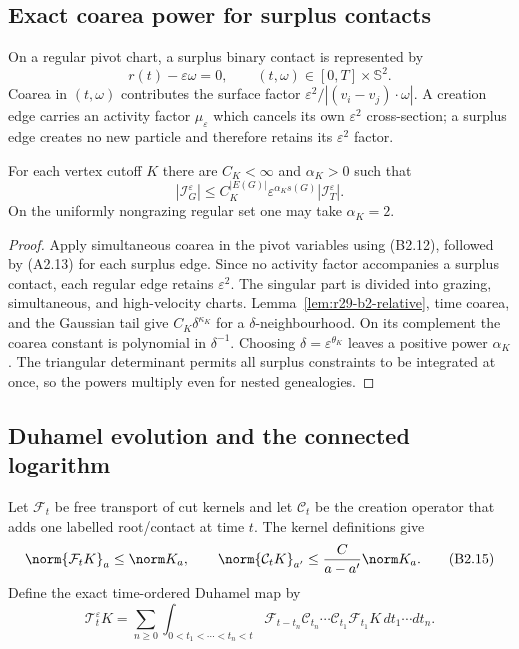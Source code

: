 \subsection{Exact coarea power for surplus contacts}

On a regular pivot chart, a surplus binary contact is represented by
\[
 r(t)-\varepsilon\omega=0,
 \qquad (t,\omega)\in[0,T]\times\mathbb S^2.              \tag{B2.13}
\]
Coarea in $(t,\omega)$ contributes the surface factor
$\varepsilon^2/|(v_i-v_j)\cdot\omega|$.  A creation edge carries an activity
factor $\mu_\varepsilon$ which cancels its own $\varepsilon^2$ cross-section;
a surplus edge creates no new particle and therefore retains its
$\varepsilon^2$ factor.

\begin{theorem}
\label{thm:r29-b2-loop}
For each vertex cutoff $K$ there are $C_K<\infty$ and $\alpha_K>0$ such that
\[
 |\mathcal I_G^\varepsilon|
 \le C_K^{|E(G)|}\varepsilon^{\alpha_Ks(G)}
       |\mathcal I_T^\varepsilon|.                        \tag{B2.14}
\]
On the uniformly nongrazing regular set one may take $\alpha_K=2$.
\end{theorem}

\begin{proof}
Apply simultaneous coarea in the pivot variables using (B2.12), followed by
(A2.13) for each surplus edge.  Since no activity factor accompanies a
surplus contact, each regular edge retains $\varepsilon^2$.  The singular part
is divided into grazing, simultaneous, and high-velocity charts.
Lemma~\ref{lem:r29-b2-relative}, time coarea, and the Gaussian tail give
$C_K\delta^{\kappa_K}$ for a $\delta$-neighbourhood.  On its complement the
coarea constant is polynomial in $\delta^{-1}$.  Choosing
$\delta=\varepsilon^{\theta_K}$ leaves a positive power $\alpha_K$.  The
triangular determinant permits all surplus constraints to be integrated at
once, so the powers multiply even for nested genealogies.
\end{proof}

\subsection{Duhamel evolution and the connected logarithm}

Let $\mathcal F_t$ be free transport of cut kernels and let $\mathcal C_t$ be
the creation operator that adds one labelled root/contact at time $t$.  The
kernel definitions give
\[
 \norm{\mathcal F_tK}_{a}\le\norm K_a,
 \qquad
 \norm{\mathcal C_tK}_{a'}\le{C\over a-a'}\norm K_a.      \tag{B2.15}
\]
Define the exact time-ordered Duhamel map by
\[
 \mathcal T_t^\varepsilon K
 =\sum_{n\ge0}\int_{0<t_1<\cdots<t_n<t}
 \mathcal F_{t-t_n}\mathcal C_{t_n}\cdots
 \mathcal C_{t_1}\mathcal F_{t_1}K\,dt_1\cdots dt_n.     \tag{B2.16}
\]

